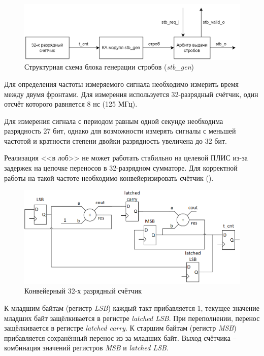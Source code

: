 \begin{figure}[ht!] 
	\center
	\includegraphics [scale=0.3] {my_folder/images//stb_gen_big}
	\caption{Структурная схема блока генерации стробов (\emph{stb\_gen})} 
	\label{fig:stb-gen-big}  
\end{figure}


Для определения частоты измеряемого сигнала необходимо измерить время между двумя фронтами.
Для измерения используется 32-разрядный счётчик, один отсчёт которого равняется 8 нс (125 МГц).

Для измерения сигнала с периодом равным одной секунде необходима разрядность 27 бит,
однако для возможности измерять сигналы с меньшей частотой 
и кратности степени двойки разрядность увеличена до 32 бит.

Реализация <<в лоб>> не может работать стабильно на целевой ПЛИС из-за задержек на цепочке переносов в 
32-разрядном сумматоре. Для корректной работы на такой частоте необходимо конвейеризировать счётчик ().

\begin{figure}[ht!] 
	\center
	\includegraphics [scale=0.7] {my_folder/images//t_cnt}
	\caption{Конвейерный 32-х разрядный счётчик} 
	\label{fig:t-cnt}  
\end{figure}

К младшим байтам (регистр \emph{LSB}) каждый такт прибавляется 1, текущее значение младших байт защёлкивается в регистре \emph{latched LSB}.
При переполнении, перенос защёлкивается в регистре \emph{latched carry}. К старшим байтам (регистр \emph{MSB}) прибавляется сохранённый перенос из-за
младших байт. Выход счётчика -- комбинация значений регистров \emph{MSB} и \emph{latched LSB}.


